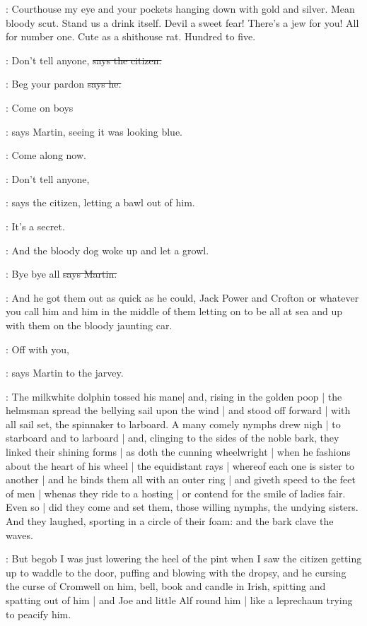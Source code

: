 \Nq:
Courthouse my eye and your pockets hanging down with gold and silver.
Mean bloody scut.
Stand us a drink itself.
Devil a sweet fear!
There's a jew for you!
All for number one.
Cute as a shithouse rat.
Hundred to five.

\citizen:
Don't tell anyone,
\sout{says the citizen.}

\Bloom:
Beg your pardon
\sout{says he.}

\cunningham:
Come on boys

\Nq:
says Martin,
seeing it was looking blue.

\cunningham:
Come along now.

\citizen:
Don't tell anyone,

\Nq:
says the citizen,
letting a bawl out of him.

\citizen:
It's a secret.

\Nq:
And the bloody dog woke up and let a growl.

\cunningham:
Bye bye all
\sout{says Martin.}

\Nq:
And he got them out as quick as he could,
Jack Power and Crofton or whatever you call him
and him in the middle of them
letting on to be all at sea
and up with them on the bloody jaunting car.

\cunningham:
Off with you,

\Nq:
says Martin to the jarvey.

:
The milkwhite dolphin tossed his mane|
and,
rising in the golden poop |
the helmsman spread the bellying sail upon the wind |
and stood off forward |
with all sail set,
the spinnaker to larboard.
A many comely nymphs drew nigh |
to starboard and to larboard |
and,
clinging to the sides of the noble bark,
they linked their shining forms |
as doth the cunning wheelwright |
when he fashions about the heart of his wheel |
the equidistant rays |
whereof each one is sister to another |
and he binds them all with an outer ring |
and giveth speed to the feet of men |
whenas they ride to a hosting |
or contend
for the smile of ladies fair.
Even so |
did they come and set them,
those willing nymphs,
the undying sisters.
And they laughed,
sporting in a circle of their foam:
and the bark clave the waves.

\Nq:
But begob I was just lowering the heel of the pint
when I saw the citizen getting up
to waddle to the door,
puffing and blowing with the dropsy,
and he cursing the curse of Cromwell on him,
bell, book and candle
in Irish,
spitting and spatting out of him |
and Joe and little Alf round him |
like a leprechaun trying to peacify him.

